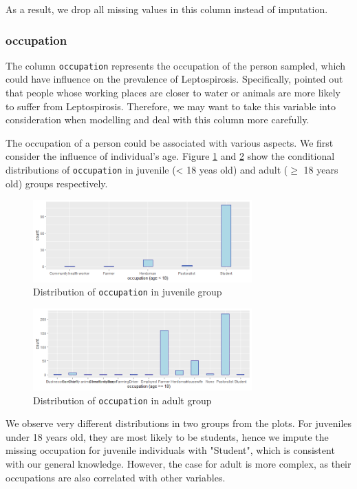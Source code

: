 \documentclass[11pt,twoside]{article}
\numberwithin{Theorem}{section}
\numberwithin{Definition}{section}
\numberwithin{Lemma}{section}
\numberwithin{Algorithm}{section}
\numberwithin{equation}{section}
\begin{document}
As a result, we drop all missing values in this column instead of imputation.

\subsubsection{occupation}

The column \texttt{occupation} represents the occupation of the person sampled, which could have influence on the prevalence of Leptospirosis. Specifically, \cite{cook2016} pointed out that people whose working places are closer to water or animals are more likely to suffer from Leptospirosis. Therefore, we may want to take this variable into consideration when modelling and deal with this column more carefully. 

The occupation of a person could be associated with various aspects. We first consider the influence of individual's age. Figure \ref{fig:occ1} and \ref{fig:occ2} show the conditional distributions of \texttt{occupation} in juvenile (< 18 yeas old) and adult ($\geq$ 18 years old) groups respectively. 

\begin{figure}[!h]
	\centering
	\includegraphics[width = 0.75\textwidth]{Images/occupation_age_1.png}
	\caption{Distribution of \texttt{occupation} in juvenile group}
	\label{fig:occ1}
\end{figure}

\begin{figure}[!h]
	\centering
	\includegraphics[width = 0.75\textwidth]{Images/occupation_age_2.png}
	\caption{Distribution of \texttt{occupation} in adult group}
	\label{fig:occ2}
\end{figure}

We observe very different distributions in two groups from the plots. For juveniles under 18 years old, they are most likely to be students, hence we impute the missing occupation for juvenile individuals with "Student", which is consistent with our general knowledge. However, the case for adult is more complex, as their occupations are also correlated with other variables. 
\end{document}
